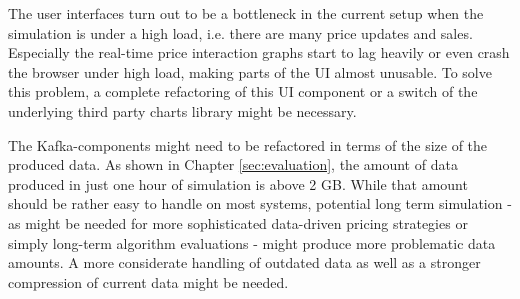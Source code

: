 The user interfaces turn out to be a bottleneck in the current setup when the simulation is under a high load, i.e. there are many price updates and sales. Especially the real-time price interaction graphs start to lag heavily or even crash the browser under high load, making parts of the UI almost unusable. To solve this problem, a complete refactoring of this UI component or a switch of the underlying third party charts library might be necessary.

The Kafka-components might need to be refactored in terms of the size of the produced data. As shown in Chapter \ref{sec:evaluation}, the amount of data produced in just one hour of simulation is above 2 GB. While that amount should be rather easy to handle on most systems, potential long term simulation - as might be needed for more sophisticated data-driven pricing strategies or simply long-term algorithm evaluations - might produce more problematic data amounts. A more considerate handling of outdated data as well as a stronger compression of current data might be needed. 



